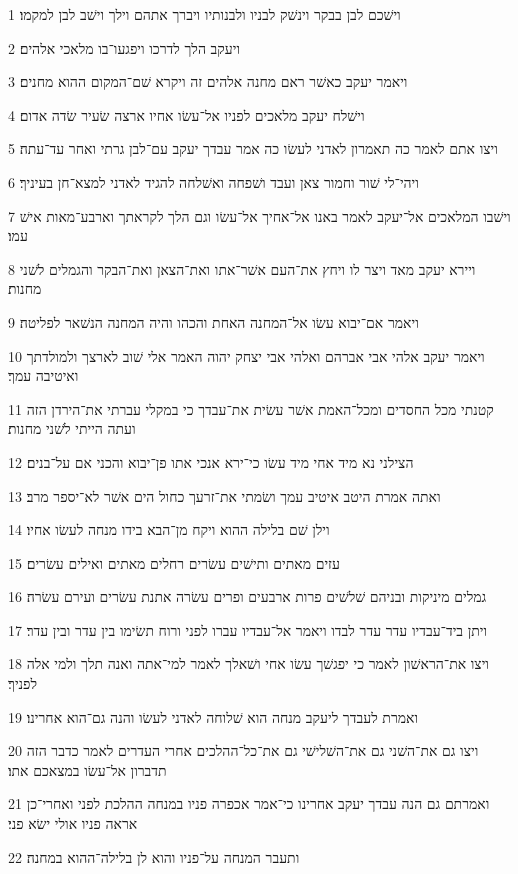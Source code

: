 \par 1 וישׁכם לבן בבקר וינשׁק לבניו ולבנותיו ויברך אתהם וילך וישׁב לבן למקמו׃
\par 2 ויעקב הלך לדרכו ויפגעו־בו מלאכי אלהים׃
\par 3 ויאמר יעקב כאשׁר ראם מחנה אלהים זה ויקרא שׁם־המקום ההוא מחנים׃
\par 4 וישׁלח יעקב מלאכים לפניו אל־עשׂו אחיו ארצה שׂעיר שׂדה אדום׃
\par 5 ויצו אתם לאמר כה תאמרון לאדני לעשׂו כה אמר עבדך יעקב עם־לבן גרתי ואחר עד־עתה׃
\par 6 ויהי־לי שׁור וחמור צאן ועבד ושׁפחה ואשׁלחה להגיד לאדני למצא־חן בעיניך׃
\par 7 וישׁבו המלאכים אל־יעקב לאמר באנו אל־אחיך אל־עשׂו וגם הלך לקראתך וארבע־מאות אישׁ עמו׃
\par 8 ויירא יעקב מאד ויצר לו ויחץ את־העם אשׁר־אתו ואת־הצאן ואת־הבקר והגמלים לשׁני מחנות׃
\par 9 ויאמר אם־יבוא עשׂו אל־המחנה האחת והכהו והיה המחנה הנשׁאר לפליטה׃
\par 10 ויאמר יעקב אלהי אבי אברהם ואלהי אבי יצחק יהוה האמר אלי שׁוב לארצך ולמולדתך ואיטיבה עמך׃
\par 11 קטנתי מכל החסדים ומכל־האמת אשׁר עשׂית את־עבדך כי במקלי עברתי את־הירדן הזה ועתה הייתי לשׁני מחנות׃
\par 12 הצילני נא מיד אחי מיד עשׂו כי־ירא אנכי אתו פן־יבוא והכני אם על־בנים׃
\par 13 ואתה אמרת היטב איטיב עמך ושׂמתי את־זרעך כחול הים אשׁר לא־יספר מרב׃
\par 14 וילן שׁם בלילה ההוא ויקח מן־הבא בידו מנחה לעשׂו אחיו׃
\par 15 עזים מאתים ותישׁים עשׂרים רחלים מאתים ואילים עשׂרים׃
\par 16 גמלים מיניקות ובניהם שׁלשׁים פרות ארבעים ופרים עשׂרה אתנת עשׂרים ועירם עשׂרה׃
\par 17 ויתן ביד־עבדיו עדר עדר לבדו ויאמר אל־עבדיו עברו לפני ורוח תשׂימו בין עדר ובין עדר׃
\par 18 ויצו את־הראשׁון לאמר כי יפגשׁך עשׂו אחי ושׁאלך לאמר למי־אתה ואנה תלך ולמי אלה לפניך׃
\par 19 ואמרת לעבדך ליעקב מנחה הוא שׁלוחה לאדני לעשׂו והנה גם־הוא אחרינו׃
\par 20 ויצו גם את־השׁני גם את־השׁלישׁי גם את־כל־ההלכים אחרי העדרים לאמר כדבר הזה תדברון אל־עשׂו במצאכם אתו׃
\par 21 ואמרתם גם הנה עבדך יעקב אחרינו כי־אמר אכפרה פניו במנחה ההלכת לפני ואחרי־כן אראה פניו אולי ישׂא פני׃
\par 22 ותעבר המנחה על־פניו והוא לן בלילה־ההוא במחנה׃

